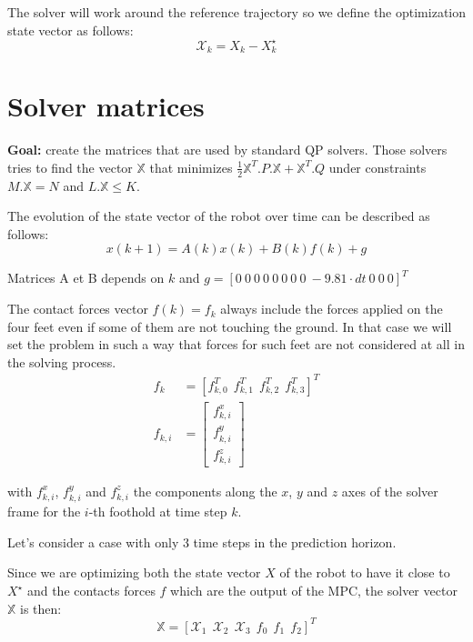 \documentclass[a4paper,11pt]{article}
\begin{document}
The solver will work around the reference trajectory so we define the optimization state vector as follows:
\begin{equation}\mathcal{X}_k = X_k - X_k^\star \end{equation}

\newpage

\section*{Solver matrices}

\textbf{Goal:} create the matrices that are used by standard QP solvers. Those solvers tries to find the vector $\mathbb{X}$ that minimizes $\frac{1}{2}\mathbb{X}^T.P.\mathbb{X} + \mathbb{X}^T.Q$ under constraints $M.\mathbb{X} = N$ and $L.\mathbb{X} \leq K$.

The evolution of the state vector of the robot over time can be described as follows:
\begin{equation}
x(k+1) = A(k) x(k) + B(k) f(k) + g
\end{equation}

Matrices A et B depends on $k$ and $g = [0 ~ 0 ~ 0 ~ 0 ~ 0 ~ 0 ~ 0 ~ 0 ~ -9.81 \cdot dt~ 0 ~ 0 ~ 0]^T$

The contact forces vector $f(k) = f_k$ always include the forces applied on the four feet even if some of them are not touching the ground. In that case we will set the problem in such a way that forces for such feet are not considered at all in the solving process.
\begin{align}
f_k &= [f_{k,0}^T ~~ f_{k,1}^T ~~ f_{k,2}^T ~~ f_{k,3}^T]^T \\
f_{k,i} &= \begin{bmatrix} f^x_{k,i} \\ f^y_{k,i} \\ f^z_{k,i} \end{bmatrix}
\end{align}

with $f^x_{k,i}$, $f^y_{k,i}$ and $f^z_{k,i}$ the components along the $x$, $y$ and $z$ axes of the solver frame for the $i$-th foothold at time step $k$.

Let's consider a case with only 3 time steps in the prediction horizon.

Since we are optimizing both the state vector $X$ of the robot to have it close to $X^\star$ and the contacts forces $f$ which are the output of the MPC, the solver vector $\mathbb{X}$ is then:
\begin{equation}
\mathbb{X} = [\mathcal{X}_1 ~~ \mathcal{X}_2 ~~ \mathcal{X}_3 ~~ f_0 ~~ f_1 ~~ f_2 ]^T
\end{equation}
\end{document}
